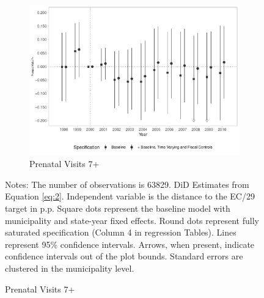\begin{figure}[h!]
\begin{center}
    \begin{subfigure}{0.32\textwidth}
        \centering
        \caption{\scriptsize Prenatal Visits 7+}\label{fig:14c}
        \includegraphics[width=\textwidth]{plots/birth_prenat_7_plus_dist_ec29_baseline_dist_ec29_baseline_14.pdf}
    \end{subfigure}
        
    
    \end{center}
    
    \scriptsize{Notes: The number of observations is 63829. DiD Estimates from Equation \ref{eq:2}. Independent variable is the distance to the EC/29 target in p.p. Square dots represent the baseline model with municipality and state-year fixed effects. Round dots represent fully saturated specification (Column 4 in regression Tables). Lines represent 95\% confidence intervals. Arrows, when present, indicate confidence intervals out of the plot bounds. Standard errors are clustered in the municipality level.}

    
\end{figure}